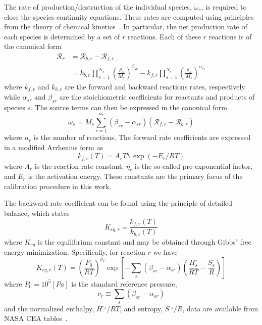 The rate of production/destruction of the individual species,
$\dot{\omega}_s$, is required to close the species continuity
equations.  These rates are computed using principles from the theory
of chemical kinetics~\cite{Kee}. In particular, the net production rate of each
species is determined by a set of $r$ reactions.
Each of these $r$ reactions is of the canonical form
\begin{align}
  \mathcal{R}_r &= \mathcal{R}_{b,r} - \mathcal{R}_{f,r} \\ &= k_{b,r}
  \prod_{s=1}^{N_s} \left(\frac{\rho_s}{M_s}\right)^{\beta_{sr}} -
  k_{f,r} \prod_{s=1}^{N_s}
  \left(\frac{\rho_s}{M_s}\right)^{\alpha_{sr}}
\end{align}
where $k_{f,r}$ and $k_{b,r}$ are the forward and backward reactions
rates, respectively while $\alpha_{sr}$ and $\beta_{sr}$ are the
stoichiometric coefficients for reactants and products of species $s$.
The source terms can then be expressed in the canonical form
%
\begin{equation}
  \dot{\omega}_s = M_s \sum_{r=1}^{n_r}\left(\beta_{sr}-\alpha_{sr}\right)\left(\mathcal{R}_{f,r} - \mathcal{R}_{b,r}\right)
\end{equation}
%
where $n_r$ is the number of reactions.
The forward rate coefficients are expressed in a modified Arrhenius form as
%
\begin{equation}\label{eq:arrhenius}
  k_{f,r}\left(T\right) = A_{r} T^{\eta_r} \exp \left(-E_{r}/RT\right)
\end{equation}
%
where
$ A_{r}$ is the reaction rate constant, $\eta_r$ is the so-called pre-exponential factor, and $E_{r}$ is the activation energy.
These constants are the primary focus of the calibration procedure in this work.

%
The backward rate coefficient can be found using the principle of detailed balance, which states
\begin{equation}
  \label{eq:k_br}
  K_{eq,r} = \frac{k_{f,r}\left(T\right)}{k_{b,r}\left(T\right)}
\end{equation}
%
where $K_{eq}$ is the equilibrium constant and may be obtained through Gibbs' free energy minimization. Specifically, for reaction $r$ we have
%
\begin{equation}
  \label{eq:k_eq}
  K_{eq,r}\left(T\right) =
  \left(\frac{P_0}{RT}\right)^{\nu_r}\exp\left[-\sum_s\left(\beta_{sr}-\alpha_{sr}\right)\left(\frac{H^\circ_s}{RT} - \frac{S^\circ_s}{R}\right)\right]
\end{equation}
%
where $P_0= 10^5 [Pa]$ is the standard reference pressure,
%
\begin{equation}
  \nu_r \equiv \sum_s\left(\beta_{sr}-\alpha_{sr}\right)
\end{equation}
%
and the normalized enthalpy, $H^{\circ_s}/RT$, and entropy, $S^{\circ_s}/R$, data are available from NASA CEA tables~\cite{CEATables}.

